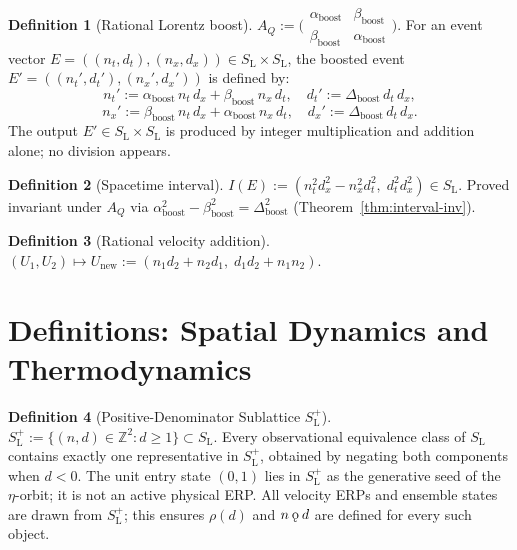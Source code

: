 \documentclass[11pt, letterpaper]{article}
\newcommand{\Z}{\mathbb{Z}}
\newcommand{\SL}{S_{\mathrm{L}}}
\newcommand{\SLpos}{S_{\mathrm{L}}^{+}}
\newcommand{\aop}{\eta}
\newcommand{\rank}{\rho}
\newcommand{\koppa}{\mathbin{\text{\rm\k{o}}}}
\theoremstyle{definition}
\newtheorem{definition}{Definition}[section]
\theoremstyle{plain}
\begin{document}
\begin{definition}[Rational Lorentz boost]\label{def:Lorentz}
$A_Q:=\bigl(\begin{smallmatrix}\alpha_{\mathrm{boost}}&\beta_{\mathrm{boost}}
\\\beta_{\mathrm{boost}}&\alpha_{\mathrm{boost}}\end{smallmatrix}\bigr)$.
For an event vector $E=((n_t,d_t),(n_x,d_x))\in\SL\times\SL$, the boosted
event $E'=((n_t',d_t'),(n_x',d_x'))$ is defined by:
\[
n_t' := \alpha_{\mathrm{boost}}\,n_t\,d_x
       +\beta_{\mathrm{boost}}\,n_x\,d_t, \quad
d_t' := \Delta_{\mathrm{boost}}\,d_t\,d_x,
\]
\[
n_x' := \beta_{\mathrm{boost}}\,n_t\,d_x
       +\alpha_{\mathrm{boost}}\,n_x\,d_t, \quad
d_x' := \Delta_{\mathrm{boost}}\,d_t\,d_x.
\]
The output $E'\in\SL\times\SL$ is produced by integer multiplication and
addition alone; no division appears.
\end{definition}

\begin{definition}[Spacetime interval]\label{def:interval}
$I(E):=(n_t^2 d_x^2-n_x^2 d_t^2,\;d_t^2 d_x^2)\in\SL$.  Proved invariant
under $A_Q$ via $\alpha_{\mathrm{boost}}^2-\beta_{\mathrm{boost}}^2
=\Delta_{\mathrm{boost}}^2$ (Theorem~\ref{thm:interval-inv}).
\end{definition}

\begin{definition}[Rational velocity addition]\label{def:vel-add}
$(U_1,U_2)\mapsto U_{\mathrm{new}}:=(n_1 d_2+n_2 d_1,\;d_1 d_2+n_1 n_2)$.
\end{definition}

\newpage

\newpage


\section{Definitions: Spatial Dynamics and Thermodynamics}\label{sec:dynamics}

\begin{definition}[Positive-Denominator Sublattice $\SLpos$]\label{def:slplus}
$\SLpos:=\{(n,d)\in\Z^2:d\geq 1\}\subset\SL$.  Every observational
equivalence class of $\SL$ contains exactly one representative in $\SLpos$,
obtained by negating both components when $d<0$.  The unit entry state
$(0,1)$ lies in $\SLpos$ as the generative seed of the $\aop$-orbit; it is
not an active physical ERP.  All velocity ERPs and ensemble states are drawn
from $\SLpos$; this ensures $\rank(d)$ and $n\koppa d$ are defined for every
such object.
\end{definition}
\end{document}
